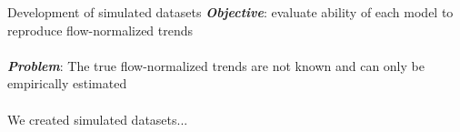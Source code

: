 \documentclass[serif]{beamer}\usepackage[]{graphicx}\usepackage[]{color}
\newcommand{\Bigtxt}[1]{\textbf{\textit{#1}}}
\begin{document}
\begin{frame}{Development of simulated datasets}
\Bigtxt{Objective}: evaluate ability of each model to reproduce flow-normalized trends\\~\\
\Bigtxt{Problem}: The true flow-normalized trends are not known and can only be empirically estimated \\~\\
We created simulated datasets...
\end{frame}
\end{document}

